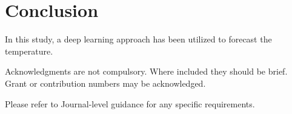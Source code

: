 \documentclass[sn-mathphys,Numbered]{sn-jnl}
\theoremstyle{thmstyleone}
\theoremstyle{thmstyletwo}
\theoremstyle{thmstylethree}
\begin{document}
\section{Conclusion}
In this study, a deep learning approach has been utilized to forecast the temperature.

Acknowledgments are not compulsory. Where included they should be brief. Grant or contribution numbers may be acknowledged.

Please refer to Journal-level guidance for any specific requirements.






\end{document}
